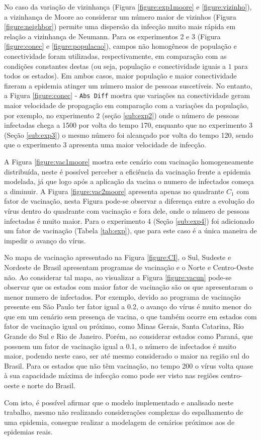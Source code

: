 \documentclass[a4paper,12pt]{article}
\begin{document}
No caso da variação de vizinhança (Figura \ref{figure:exp1moore} e \ref{figure:vizinho}), a vizinhança de Moore ao considerar um número maior de vizinhos (Figura \ref{figure:neighbor}) permite uma dispersão da infecção muito mais rápida em relação a vizinhança de Neumann. Para os experimentos 2 e 3 (Figura \ref{figure:conec} e \ref{figure:populacao}), campos não homogêneos de população e conectividade foram utilizadas, respectivamente, em comparação com as condições constantes destas (ou seja, população e conectividade iguais a $1$ para todos os estados).
Em ambos casos, maior população e maior conectividade fizeram a epidemia atinger um número maior de pessoas suscetíveis. No entanto, a Figura \ref{figure:conec} - \texttt{Abs Diff} mostra que variações na conectividade geram maior velocidade de propagação em comparação com a variações da população, por exemplo, no experimento 2 (seção \ref{sub:exp2}) onde o número de pessoas infectadas chega a 1500 por volta do tempo 170, enquanto que no experimento 3 (Seção \ref{sub:exp3}) o mesmo número foi alcançado por volta do tempo 120, sendo que o experimento 3 apresenta uma maior velocidade de infecção. 

A Figura \ref{figure:vac1moore} mostra este cenário com vacinação homogeneamente distribuída, neste é possível perceber a eficiência da vacinação frente a epidemia modelada, já que logo após a aplicação da vacina o numero de infectados começa a diminuir. A Figura \ref{figure:vac2moore} apresenta apenas no quadrante $C_1$ com fator de vacinação, nesta Figura pode-se observar a diferença entre a evolução do vírus dentro do quadrante com vacinação e fora dele, onde o número de pessoas infectadas é muito maior. Para o experimento 4 (Seção \ref{sub:exp4}) foi adicionado um fator de vacinação (Tabela \ref{tab:exp}), que para este caso é a única maneira de impedir o avanço do vírus. 

No mapa de vacinação apresentado na Figura \ref{figure:CI}, o Sul, Sudeste e Nordeste de Brasil apresentam programas de vacinação e o Norte e Centro-Oeste não. Ao considerar tal mapa, ao visualizar a Figura \ref{figure:vacun} pode-se observar que os estados com maior fator de vacinação são os que apresentaram o menor numero de infectados. Por exemplo, devido ao programa de vacinação presente em São Paulo ter fator igual a 0.2, o avanço do vírus é muito menor do que em um cenário sem presença de vacina, o que também ocorre em estados com fator de vacinação igual ou próximo, como Minas Gerais, Santa Catarina, Rio Grande do Sul e Rio de Janeiro. Porém, ao considerar estados como Paraná, que possuem um fator de vacinação igual a 0.1, o número de infectados é muito maior, podendo neste caso, ser até mesmo considerado o maior na região sul do Brasil. Para os estados que não têm vacinação, no tempo 200 o vírus volta quase à sua capacidade máxima de infecção como pode ser visto nas regiões centro-oeste e norte do Brasil.

Com isto, é possível afirmar que o modelo implementado e analisado neste trabalho, mesmo não realizando considerações complexas do espalhamento de uma epidemia, consegue realizar a modelagem de cenários próximos aos de epidemias reais.

\newpage


\end{document}
